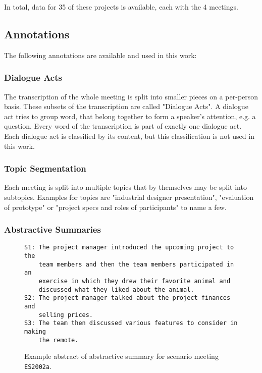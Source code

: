 In total, data for 35 of these projects is available, each with the 4 meetings. \cite[p.~2]{Mccowan05theami}

\subsection{Annotations}

The following annotations are available and used in this work:

\subsubsection{Dialogue Acts}

The transcription of the whole meeting is split into smaller pieces on a per-person basis.
These subsets of the transcription are called "Dialogue Acts".
A dialogue act tries to group word, that belong together to form a speaker's attention, e.g. a question.
Every word of the transcription is part of exactly one dialogue act.
Each dialogue act is classified by its content, but this classification is not used in this work. \cite{amiWebsite}

\subsubsection{Topic Segmentation}

Each meeting is split into multiple topics that by themselves may be split into subtopics.
Examples for topics are "industrial designer presentation", "evaluation of prototype" or "project specs and roles of
participants" to name a few. \cite{amiWebsite}

\subsubsection{Abstractive Summaries}

\begin{figure}[h]
\begin{lstlisting}[numbers=none]
S1: The project manager introduced the upcoming project to the 
    team members and then the team members participated in an
    exercise in which they drew their favorite animal and
    discussed what they liked about the animal.
S2: The project manager talked about the project finances and
    selling prices.
S3: The team then discussed various features to consider in making
    the remote.
\end{lstlisting}
\caption{Example abstract of abstractive summary for scenario meeting \texttt{ES2002a}.}
\label{fig:abstractive-summary-example}
\end{figure}

